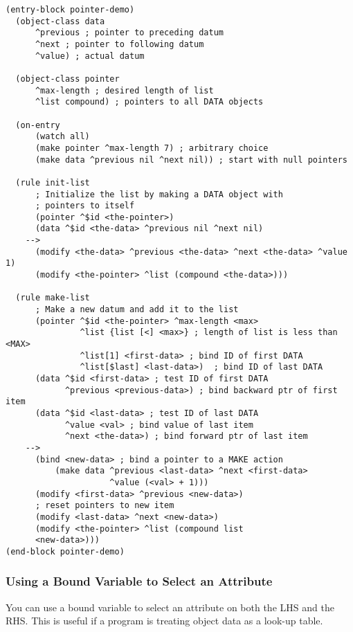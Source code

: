 \begin{exampl}
\begin{verbatim}
(entry-block pointer-demo)
  (object-class data
      ^previous ; pointer to preceding datum
      ^next ; pointer to following datum
      ^value) ; actual datum

  (object-class pointer
      ^max-length ; desired length of list
      ^list compound) ; pointers to all DATA objects

  (on-entry
      (watch all)
      (make pointer ^max-length 7) ; arbitrary choice
      (make data ^previous nil ^next nil)) ; start with null pointers

  (rule init-list
      ; Initialize the list by making a DATA object with  
      ; pointers to itself
      (pointer ^$id <the-pointer>)
      (data ^$id <the-data> ^previous nil ^next nil)
    -->
      (modify <the-data> ^previous <the-data> ^next <the-data> ^value 1)
      (modify <the-pointer> ^list (compound <the-data>)))

  (rule make-list
      ; Make a new datum and add it to the list
      (pointer ^$id <the-pointer> ^max-length <max>
               ^list {list [<] <max>} ; length of list is less than <MAX>
               ^list[1] <first-data> ; bind ID of first DATA
               ^list[$last] <last-data>)  ; bind ID of last DATA
      (data ^$id <first-data> ; test ID of first DATA
            ^previous <previous-data>) ; bind backward ptr of first item
      (data ^$id <last-data> ; test ID of last DATA
            ^value <val> ; bind value of last item
            ^next <the-data>) ; bind forward ptr of last item
    -->
      (bind <new-data> ; bind a pointer to a MAKE action
          (make data ^previous <last-data> ^next <first-data> 
                     ^value (<val> + 1)))
      (modify <first-data> ^previous <new-data>)
      ; reset pointers to new item
      (modify <last-data> ^next <new-data>)
      (modify <the-pointer> ^list (compound list
      <new-data>)))
(end-block pointer-demo)
\end{verbatim}
\label{e:3-5}
\end{exampl}

\subsubsection*{Using a Bound Variable to Select an Attribute}

You can use a bound variable to select an attribute on both the LHS
and the RHS. This is useful if a program is treating object data as a
look-up table.

